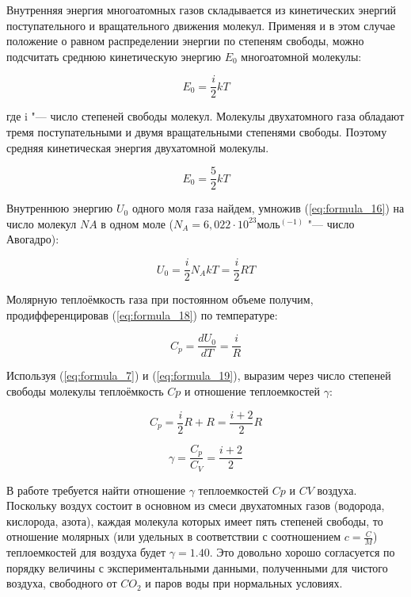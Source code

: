 Внутренняя энергия многоатомных газов складывается из кинетических энергий поступательного и вращательного движения молекул. Применяя и в этом случае положение о равном распределении энергии по степеням свободы, можно подсчитать среднюю кинетическую энергию $E_0$ многоатомной молекулы:

\begin{equation}
    E_0 = \frac{i}{2} k T
    \label{eq:formula_16}
\end{equation}

где i "--- число степеней свободы молекул. Молекулы двухатомного газа обладают тремя поступательными и двумя вращательными степенями свободы. Поэтому средняя кинетическая энергия двухатомной молекулы.

\begin{equation}
    E_0 = \frac{5}{2} k T
    \label{eq:formula_17}
\end{equation}

Внутреннюю энергию $U_0$ одного моля газа найдем, умножив (\ref{eq:formula_16}) на число молекул $NA$ в одном моле ($N_A = 6,022·10^23 моль^(-1)$ "--- число Авогадро):

\begin{equation}
    U_0 = \frac{i}{2} N_A k T = \frac{i}{2} R T
    \label{eq:formula_18}
\end{equation}

Молярную теплоёмкость газа при постоянном объеме получим, продифференцировав (\ref{eq:formula_18}) по температуре:

\begin{equation}
    C_p = \frac{d U_0}{d T} = \frac{i}{R}
    \label{eq:formula_19}
\end{equation}

Используя (\ref{eq:formula_7}) и (\ref{eq:formula_19}), выразим через число степеней свободы молекулы теплоёмкость $Cp$ и отношение теплоемкостей $\gamma$:

\begin{equation*}
    C_p = \frac{i}{2} R + R = \frac{i + 2}{2} R
\end{equation*}

\begin{equation*}
    \gamma = \frac{C_p}{C_V} = \frac{i + 2}{2}
\end{equation*}

В работе требуется найти отношение $\gamma$ теплоемкостей $Cp$ и $CV$ воздуха. Поскольку воздух состоит в основном из смеси двухатомных газов (водорода, кислорода, азота), каждая молекула которых имеет пять степеней свободы, то отношение молярных (или удельных в соответствии с соотношением $c = \frac{C}{M}$) теплоемкостей для воздуха будет $\gamma = 1.40$. Это довольно хорошо согласуется по порядку величины с экспериментальными данными, полученными для чистого воздуха, свободного от $CO_2$ и паров воды при нормальных условиях.

